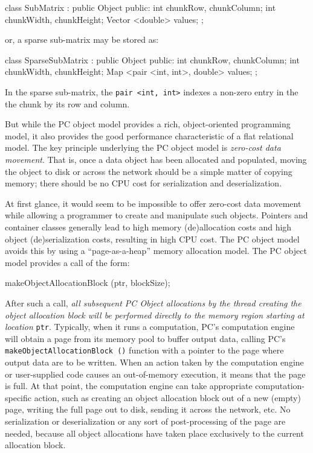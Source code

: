 \begin{code}
class SubMatrix : public Object {
public:
	int chunkRow, chunkColumn;
	int chunkWidth, chunkHeight;
	Vector <double> values; 
};
\end{code}

or, a sparse sub-matrix may be stored as:

\begin{code}
class SparseSubMatrix : public Object {
public:
	int chunkRow, chunkColumn;
	int chunkWidth, chunkHeight;
	Map <pair <int, int>, double> values; 
};
\end{code}

In the sparse sub-matrix, the \texttt{pair <int, int>} indexes a non-zero entry in the the chunk by its row and column.

But while the PC object model provides a rich, object-oriented programming model, it also provides the good performance characteristic
of a flat relational model.
The key principle underlying the PC object model is \emph{zero-cost data movement}.  That is, once a data object
has been allocated and populated, moving the object to disk or across the network should be a simple matter of copying memory; there
should be no CPU cost for serialization and deserialization.

At first glance, it would seem to be impossible to offer zero-cost data movement while allowing a programmer to create and manipulate such objects.  
Pointers and container classes 
generally lead to high memory (de)allocation costs and high object (de)serialization costs, resulting in high CPU cost.
The PC object model avoids this 
by using a ``page-as-a-heap'' memory allocation model.  
The PC object model provides a call of the form:

\begin{code}
makeObjectAllocationBlock (ptr, blockSize);
\end{code}

After such a call, \emph{all subsequent PC Object allocations by the thread creating the object allocation block will be performed directly to the memory
region starting at location} \texttt{ptr}.
Typically, when it runs a computation, PC's computation engine will obtain a page from its memory pool to buffer output data, calling
PC's
\texttt{makeObjectAllocationBlock ()} function with a pointer to the page where output data are to be written.  
When an action taken by the computation engine or user-supplied code causes an
out-of-memory execution, it means that the page is full.  At that point, the computation engine can take appropriate computation-specific 
action, such as creating 
an object allocation block out of a new (empty) page, writing the full page out to disk, sending it across the network, etc.  
No serialization or deserialization or any sort of post-processing of the page are needed, 
because all object allocations have taken place exclusively to the current allocation block.  

